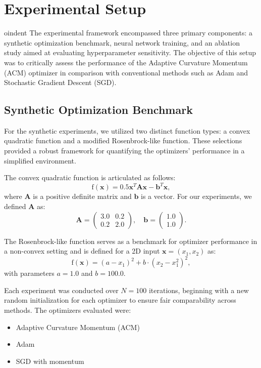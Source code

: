 \documentclass{article} %
\begin{document}
\section{Experimental Setup}
\label{sec:experimental}

oindent The experimental framework encompassed three primary components: a synthetic optimization benchmark, neural network training, and an ablation study aimed at evaluating hyperparameter sensitivity. The objective of this setup was to critically assess the performance of the Adaptive Curvature Momentum (ACM) optimizer in comparison with conventional methods such as Adam and Stochastic Gradient Descent (SGD).

\subsection{Synthetic Optimization Benchmark}

For the synthetic experiments, we utilized two distinct function types: a convex quadratic function and a modified Rosenbrock-like function. These selections provided a robust framework for quantifying the optimizers' performance in a simplified environment.

The convex quadratic function is articulated as follows:
$$
\text{f} (\mathbf{x}) = 0.5 \mathbf{x}^T \mathbf{A} \mathbf{x} - \mathbf{b}^T \mathbf{x},
$$
where \( \mathbf{A} \) is a positive definite matrix and \( \mathbf{b} \) is a vector. For our experiments, we defined \( \mathbf{A} \) as:
$$
\mathbf{A} = \begin{pmatrix} 3.0 & 0.2 \\
0.2 & 2.0 \end{pmatrix}, \quad \mathbf{b} = \begin{pmatrix} 1.0 \\
1.0 \end{pmatrix}.
$$

The Rosenbrock-like function serves as a benchmark for optimizer performance in a non-convex setting and is defined for a 2D input \( \mathbf{x} = (x_1, x_2) \) as:
$$
\text{f} (\mathbf{x}) = (a - x_1)^2 + b \cdot (x_2 - x_1^2)^2,
$$
with parameters \( a = 1.0 \) and \( b = 100.0 \).

Each experiment was conducted over \( N = 100 \) iterations, beginning with a new random initialization for each optimizer to ensure fair comparability across methods. The optimizers evaluated were:
\begin{itemize}
    \item Adaptive Curvature Momentum (ACM)
    \item Adam
    \item SGD with momentum
\end{itemize}
\end{document}
